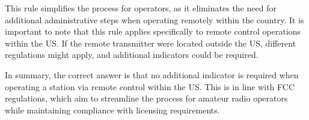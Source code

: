 This rule simplifies the process for operators, as it eliminates the need for additional administrative steps when operating remotely within the country. It is important to note that this rule applies specifically to remote control operations within the US. If the remote transmitter were located outside the US, different regulations might apply, and additional indicators could be required.

In summary, the correct answer is that no additional indicator is required when operating a station via remote control within the US. This is in line with FCC regulations, which aim to streamline the process for amateur radio operators while maintaining compliance with licensing requirements.

